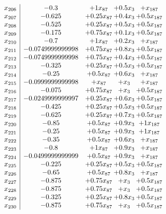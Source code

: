 \documentclass[11pt]{article}
\begin{document}
\[\begin{array}{c| c c@{\hskip 2pt} c@{\hskip 2pt} c@{\hskip 2pt} }
 x_{206}   &  -0.3 & + 1 x_{87} & + 0.5 x_{3} & +  x_{187}\\
 x_{207}   &  -0.625 & + 0.25 x_{87} & + 0.4 x_{3} & + 0.5 x_{187}\\
 x_{208}   &  -0.525 & + 0.25 x_{87} & + 0.5 x_{3} & + 0.5 x_{187}\\
 x_{209}   &  -0.175 & + 0.75 x_{87} & + 0.1 x_{3} & + 0.5 x_{187}\\
 x_{210}   &  -0.7 & + 1 x_{87} & + 0.2 x_{3} & +  x_{187}\\
 x_{211}   &  -0.0749999999998 & + 0.75 x_{87} & + 0.8 x_{3} & + 0.5 x_{187}\\
 x_{212}   &  -0.0749999999998 & + 0.75 x_{87} & + 0.4 x_{3} & + 0.5 x_{187}\\
 x_{213}   &  -0.325 & + 0.25 x_{87} & + 0.5 x_{3} & + 0.5 x_{187}\\
 x_{214}   &  -0.25 & + 0.5 x_{87} & + 0.6 x_{3} & +  x_{187}\\
 x_{215}   &  -0.0999999999998 & +  x_{87} & +  x_{3} & +  x_{187}\\
 x_{216}   &  -0.075 & + 0.75 x_{87} & +  x_{3} & + 0.5 x_{187}\\
 x_{217}   &  -0.0249999999997 & + 0.25 x_{87} & + 0.6 x_{3} & + 0.5 x_{187}\\
 x_{218}   &  -0.425 & + 0.25 x_{87} & + 0.5 x_{3} & + 0.5 x_{187}\\
 x_{219}   &  -0.625 & + 0.25 x_{87} & + 0.7 x_{3} & + 0.5 x_{187}\\
 x_{220}   &  -0.85 & + 0.5 x_{87} & + 0.9 x_{3} & + 1 x_{187}\\
 x_{221}   &  -0.25 & + 0.5 x_{87} & + 0.9 x_{3} & + 1 x_{187}\\
 x_{222}   &  -0.35 & + 0.5 x_{87} & + 0.6 x_{3} & +  x_{187}\\
 x_{223}   &  -0.8 & + 1 x_{87} & + 0.9 x_{3} & +  x_{187}\\
 x_{224}   &  -0.0499999999999 & + 0.5 x_{87} & + 0.9 x_{3} & +  x_{187}\\
 x_{225}   &  -0.225 & + 0.25 x_{87} & + 0.5 x_{3} & + 0.5 x_{187}\\
 x_{226}   &  -0.65 & + 0.5 x_{87} & + 0.8 x_{3} & +  x_{187}\\
 x_{227}   &  -0.875 & + 0.75 x_{87} & +  x_{3} & + 0.5 x_{187}\\
 x_{228}   &  -0.875 & + 0.75 x_{87} & +  x_{3} & + 0.5 x_{187}\\
 x_{229}   &  -0.325 & + 0.25 x_{87} & + 0.8 x_{3} & + 0.5 x_{187}\\
 x_{230}   &  -0.875 & + 0.75 x_{87} & +  x_{3} & + 0.5 x_{187}\\

\end{array}\]
\end{document}
